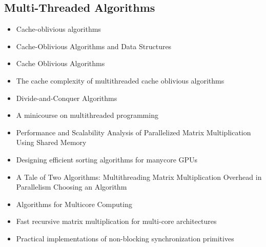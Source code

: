 \subsection{Multi-Threaded Algorithms}

\begin{itemize}
\item[\textbullet] Cache-oblivious algorithms \cite{Frigo1999}
\item[\textbullet] Cache-Oblivious Algorithms and Data Structures
  \cite{Demaine2002}
\item[\textbullet] Cache Oblivious Algorithms \cite{Kumar2003}
\item[\textbullet] The cache complexity of multithreaded cache
  oblivious algorithms \cite{Frigo2009}
\item[\textbullet] Divide-and-Conquer Algorithms \cite{Gurari2010}
\item[\textbullet] A minicourse on multithreaded programming
  \cite{Leiserson1998}
\item[\textbullet] Performance and Scalability Analysis of
  Parallelized Matrix Multiplication Using Shared Memory
  \cite{Dinkins2007}
\item[\textbullet] Designing efficient sorting algorithms for manycore
  GPUs \cite{Satish2009}
\item[\textbullet] A Tale of Two Algorithms: Multithreading Matrix
  Multiplication Overhead in Parallelism Choosing an Algorithm
  \cite{Steele2010}
\item[\textbullet] Algorithms for Multicore Computing
  \cite{Ramachandran2008}
\item[\textbullet] Fast recursive matrix multiplication for multi-core
  architectures \cite{Runger2010}
\item[\checkmark] Practical implementations of non-blocking
  synchronization primitives \cite{Moir1997}
\end{itemize}



